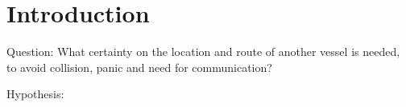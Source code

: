 \chapter*{Introduction}

Question: What certainty on the location and route of another vessel is needed, to avoid collision, panic and need for communication?

Hypothesis: